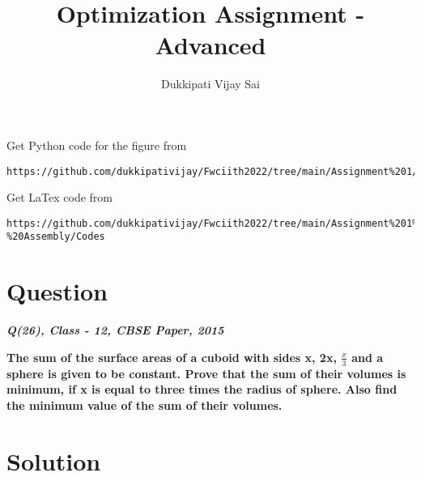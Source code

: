 \documentclass[journal,12pt,twocolumn]{IEEEtran}
\begin{document}
\makeatother
\let\StandardTheFigure\thefigure
\let\vec\mathbf
\renewcommand{\thefigure}{\theproblem}
\def\putbox#1#2#3{\makebox[0in][l]{\makebox[#1][l]{}\raisebox{\baselineskip}[0in][0in]{\raisebox{#2}[0in][0in]{#3}}}}
     \def\rightbox#1{\makebox[0in][r]{#1}}
     \def\centbox#1{\makebox[0in]{#1}}
     \def\topbox#1{\raisebox{-\baselineskip}[0in][0in]{#1}}
     \def\midbox#1{\raisebox{-0.5\baselineskip}[0in][0in]{#1}}
\vspace{3cm}
\title{\textbf{Optimization Assignment - Advanced} }
\author{Dukkipati Vijay Sai}
\maketitle
\newpage
\bigskip
\renewcommand{\thefigure}{\theenumi}
\renewcommand{\thetable}{\theenumi}
Get Python code for the figure from 
\begin{lstlisting}
https://github.com/dukkipativijay/Fwciith2022/tree/main/Assignment%201/Codes/src
\end{lstlisting}
Get LaTex code from
\begin{lstlisting}
https://github.com/dukkipativijay/Fwciith2022/tree/main/Assignment%201%20-%20Assembly/Codes
\end{lstlisting}
%
\section{Question}
\centering
\textbf{\textit{Q(26), Class - 12, CBSE Paper, 2015}}\\
\vspace{0.25cm}
\raggedright
\textbf{The sum of the surface areas of a cuboid with sides x, 2x, $\frac{x}{3}$ and a sphere is given to be constant. Prove that the sum of their volumes is minimum, if x is equal to three times the radius of sphere. Also find the minimum value of the sum of their volumes.}\\
\raggedright
\section{Solution}
\end{document}

